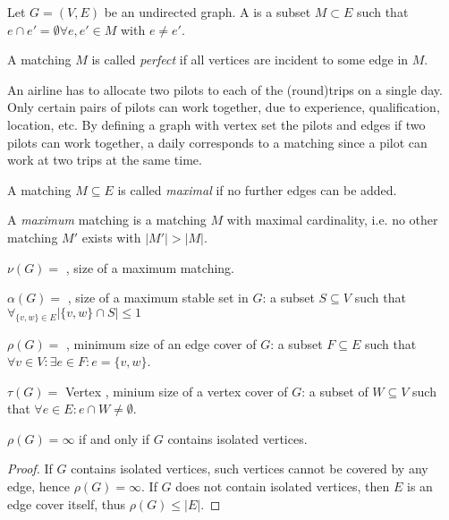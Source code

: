 \begin{lec}[2011-10-31]\end{lec}


\begin{defn}
Let $G = (V, E)$ be an undirected graph. A  is a
subset $M \subset E$ such that $e \cap e' = \emptyset \forall e, e' \in M$
with $e \neq e'$.

A matching $M$ is called \emph{perfect} if all vertices are incident to
some edge in $M$.
\end{defn}

\begin{xmp+}
An airline has to allocate two pilots to each of the (round)trips on a
single day. Only certain pairs of pilots can work together, due to
experience, qualification, location, etc. By defining a graph with vertex
set the pilots and edges if two pilots can work together, a daily
corresponds to a matching since a pilot can work at two trips at the same
time.
\end{xmp+}

\begin{defn}
A matching $M \subseteq E$ is called \emph{maximal} if no further edges can
be added.

A \emph{maximum} matching is a matching $M$ with maximal cardinality, i.e.
no other matching $M'$ exists with $|M'| > |M|$.

$\nu(G) =$ , size of a maximum matching.
\end{defn}

$\alpha(G) = $ , size of a maximum stable set in
$G$: a subset $S \subseteq V$ such that $\forall_{\{v, w\} \in E} \left|
\{v, w\} \cap S \right| \leq 1$

$\rho(G) = $ , minimum size of an
edge cover of $G$: a subset $F \subseteq E$ such that $\forall v \in V:
\exists e \in F: e = \{ v, w \}$.

$\tau(G) = $ Vertex , minium size of a
vertex cover of $G$: a subset of $W \subseteq V$ such that $\forall e \in E:
e \cap W \neq \emptyset$.

\begin{lem}
$\rho(G) = \infty$ if and only if $G$ contains isolated vertices.
\end{lem}
\begin{proof}
If $G$ contains isolated vertices, such vertices cannot be covered by any
edge, hence $\rho(G) = \infty$. If $G$ does not contain isolated vertices,
then $E$ is an edge cover itself, thus $\rho(G) \leq |E|$.
\end{proof}

